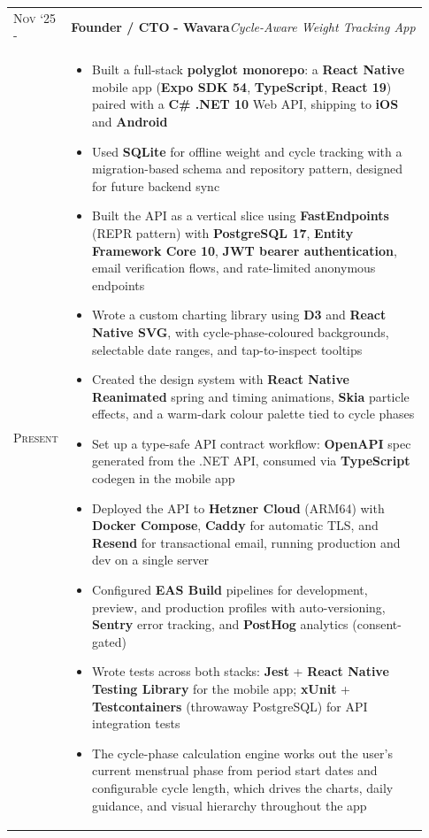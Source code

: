\documentclass[a4paper,10pt]{extarticle} %
\begin{document}
{\begin{longtable}{>{\raggedright\arraybackslash}p{0.08\linewidth} | >{\raggedright\arraybackslash}p{0.85\linewidth}}
\textsc{Nov ‘25 -} & \textbf{Founder / CTO} \textbf{ - Wavara}\hfill\textit{Cycle-Aware Weight Tracking App}\\
\textsc{Present} & \parbox[t]{\linewidth}{
\vspace{-7pt}
\begin{itemize}[leftmargin=*, itemsep=3pt]
    \item Built a full-stack \textbf{polyglot monorepo}: a \textbf{React Native} mobile app (\textbf{Expo SDK 54}, \textbf{TypeScript}, \textbf{React 19}) paired with a \textbf{C\# .NET 10} Web API, shipping to \textbf{iOS} and \textbf{Android}
    \item Used \textbf{SQLite} for offline weight and cycle tracking with a migration-based schema and repository pattern, designed for future backend sync
    \item Built the API as a vertical slice using \textbf{FastEndpoints} (REPR pattern) with \textbf{PostgreSQL 17}, \textbf{Entity Framework Core 10}, \textbf{JWT bearer authentication}, email verification flows, and rate-limited anonymous endpoints
    \item Wrote a custom charting library using \textbf{D3} and \textbf{React Native SVG}, with cycle-phase-coloured backgrounds, selectable date ranges, and tap-to-inspect tooltips
    \item Created the design system with \textbf{React Native Reanimated} spring and timing animations, \textbf{Skia} particle effects, and a warm-dark colour palette tied to cycle phases
    \item Set up a type-safe API contract workflow: \textbf{OpenAPI} spec generated from the .NET API, consumed via \textbf{TypeScript} codegen in the mobile app
    \item Deployed the API to \textbf{Hetzner Cloud} (ARM64) with \textbf{Docker Compose}, \textbf{Caddy} for automatic TLS, and \textbf{Resend} for transactional email, running production and dev on a single server
    \item Configured \textbf{EAS Build} pipelines for development, preview, and production profiles with auto-versioning, \textbf{Sentry} error tracking, and \textbf{PostHog} analytics (consent-gated)
    \item Wrote tests across both stacks: \textbf{Jest} + \textbf{React Native Testing Library} for the mobile app; \textbf{xUnit} + \textbf{Testcontainers} (throwaway PostgreSQL) for API integration tests
    \item The cycle-phase calculation engine works out the user's current menstrual phase from period start dates and configurable cycle length, which drives the charts, daily guidance, and visual hierarchy throughout the app
\end{itemize}
}\\
 \\


\end{longtable}}
\end{document}

